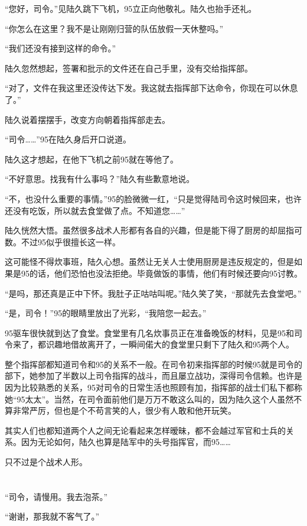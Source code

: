 “您好，司令。”见陆久跳下飞机，95立正向他敬礼。陆久也抬手还礼。

“你怎么在这里？我不是让刚刚归营的队伍放假一天休整吗。”

“我们还没有接到这样的命令。”

陆久忽然想起，签署和批示的文件还在自己手里，没有交给指挥部。

“对了，文件在我这里还没传达下发。我这就去指挥部下达命令，你现在可以休息了。”

陆久说着摆摆手，改变方向朝着指挥部走去。

“司令……”95在陆久身后开口说道。

陆久这才想起，在他下飞机之前95就在等他了。

“不好意思。找我有什么事吗？”陆久有些歉意地说。

“不，也没什么重要的事情。”95的脸微微一红，“只是觉得陆司令这时候回来，也许还没有吃饭，所以就去食堂做了点。不知道您……”

陆久恍然大悟。虽然很多战术人形都有各自的兴趣，但是能下得了厨房的却屈指可数。不过95似乎很擅长这一样。

这可能怪不得炊事班，陆久心想。虽然让无关人士使用厨房是违反规定的，但是如果是95的话，他们恐怕也没法拒绝。毕竟做饭的事情，他们有时候还要向95讨教。

“是吗，那还真是正中下怀。我肚子正咕咕叫呢。”陆久笑了笑，“那就先去食堂吧。”

“是，司令！”95的眼睛里放出了光彩，“我陪您一起去。”

95驱车很快就到达了食堂。食堂里有几名炊事员正在准备晚饭的材料，见是95和司令来了，都识趣地借故离开了，一瞬间偌大的食堂里只剩下了陆久和95两个人。

整个指挥部都知道司令和95的关系不一般。在司令初来指挥部的时候95就是司令的部下，她参加了半数以上司令指挥的战斗，而且屡立战功，深得司令信赖。也许是因为比较熟悉的关系，95对司令的日常生活也照顾有加，指挥部的战士们私下都称她“95太太”。当然，在司令面前他们是万万不敢这么叫的，因为陆久这个人虽然不算非常严厉，但也是个不苟言笑的人，很少有人敢和他开玩笑。

其实人们也都知道两个人之间无论看起来怎样暧昧，都不会越过军官和士兵的关系。因为无论如何，陆久也算是陆军中的头号指挥官，而95……

只不过是个战术人形。
\section*{}

“司令，请慢用。我去泡茶。”

“谢谢，那我就不客气了。”


